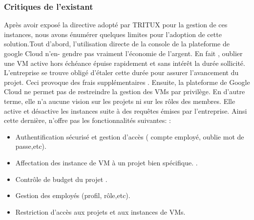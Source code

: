 \subsubsection{Critiques de l'existant}
Après avoir exposé la  directive adopté par TRITUX pour la gestion de ces instances,  nous  avons  énumérer  quelques limites pour l'adoption de cette solution.Tout  d'abord,  l'utilisation  directe  de  la  console  de  la  plateforme  de  google  Cloud  n'en- 
gendre pas vraiment l'économie de l'argent. En fait , oublier une VM active hors échéance 
épuise rapidement et sans intérêt la durée sollicité. L'entreprise se trouve obligé d'étaler cette durée pour assurer l'avancement du projet. Ceci provoque  des  frais  supplémentaires .  Ensuite,  la  plateforme  de  Google  Cloud  ne  permet 
pas  de  restreindre  la gestion  des  VMs  par  privilège. En d'autre terme, elle n'a aucune vision sur les projets ni sur les rôles des membres. Elle active et désactive les instances suite à des requêtes émises par l'entreprise.  Ainsi  cette  dernière,  n'offre pas les  fonctionnalités  suivantes: 
: \begin{itemize}
	\item Authentification sécurisé et gestion d'accès ( compte employé, oublie mot de passe,etc).
	\item Affectation des  instance  de  VM  à  un  projet bien spécifique. .
	\item Contrôle de budget  du  projet  .
	\item Gestion  des  employés (profil, rôle,etc).
	\item Restriction d'accès  aux  projets  et  aux instances  de  VMs.
\end{itemize}

